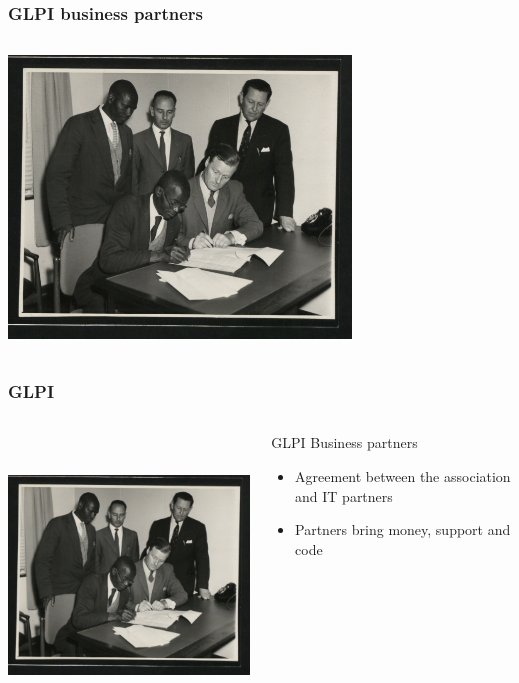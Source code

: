 \documentclass{beamer}
\begin{document}
\begin{frame}


    \frametitle{GLPI business partners}
 \begin{columns}
 \begin{column}{0.45\textwidth}
         \includegraphics[height=7.5cm]{./pics/agreement.jpg}
 \end{column}
 \begin{column}{0.45\textwidth}
 \end{column}
\end{columns}
\end{frame}

\begin{frame}

    \frametitle{GLPI}

 \begin{columns}
 \begin{column}{0.35\textwidth}
         \includegraphics[height=7.5cm]{./pics/agreement.jpg}
 \end{column}
 \begin{column}{0.65\textwidth}

    \begin{block}{GLPI Business partners}
        \begin{itemize}
            \item Agreement between the association and IT partners
            \item Partners bring money, support and code
        \end{itemize}
    \end{block}


 \end{column}
\end{columns}

\end{frame}
\end{document}
